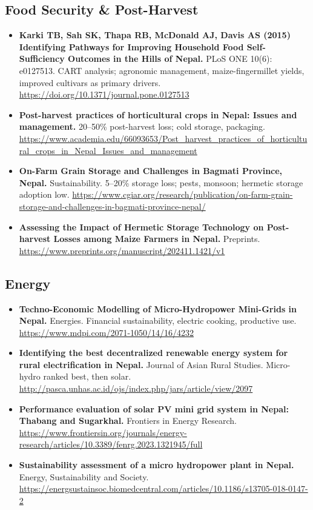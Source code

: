\documentclass[11pt,a4paper]{article}
\begin{document}
\subsection{Food Security \& Post-Harvest}
\begin{itemize}
    \item \textbf{Karki TB, Sah SK, Thapa RB, McDonald AJ, Davis AS (2015) Identifying Pathways for Improving Household Food Self-Sufficiency Outcomes in the Hills of Nepal.} PLoS ONE 10(6): e0127513. CART analysis; agronomic management, maize-fingermillet yields, improved cultivars as primary drivers. \url{https://doi.org/10.1371/journal.pone.0127513}
    \item \textbf{Post-harvest practices of horticultural crops in Nepal: Issues and management.} 20--50\% post-harvest loss; cold storage, packaging. \url{https://www.academia.edu/66093653/Post_harvest_practices_of_horticultural_crops_in_Nepal_Issues_and_management}
    \item \textbf{On-Farm Grain Storage and Challenges in Bagmati Province, Nepal.} Sustainability. 5--20\% storage loss; pests, monsoon; hermetic storage adoption low. \url{https://www.cgiar.org/research/publication/on-farm-grain-storage-and-challenges-in-bagmati-province-nepal/}
    \item \textbf{Assessing the Impact of Hermetic Storage Technology on Post-harvest Losses among Maize Farmers in Nepal.} Preprints. \url{https://www.preprints.org/manuscript/202411.1421/v1}
\end{itemize}

\subsection{Energy}
\begin{itemize}
    \item \textbf{Techno-Economic Modelling of Micro-Hydropower Mini-Grids in Nepal.} Energies. Financial sustainability, electric cooking, productive use. \url{https://www.mdpi.com/2071-1050/14/16/4232}
    \item \textbf{Identifying the best decentralized renewable energy system for rural electrification in Nepal.} Journal of Asian Rural Studies. Micro-hydro ranked best, then solar. \url{http://pasca.unhas.ac.id/ojs/index.php/jars/article/view/2097}
    \item \textbf{Performance evaluation of solar PV mini grid system in Nepal: Thabang and Sugarkhal.} Frontiers in Energy Research. \url{https://www.frontiersin.org/journals/energy-research/articles/10.3389/fenrg.2023.1321945/full}
    \item \textbf{Sustainability assessment of a micro hydropower plant in Nepal.} Energy, Sustainability and Society. \url{https://energsustainsoc.biomedcentral.com/articles/10.1186/s13705-018-0147-2}
\end{itemize}
\end{document}
